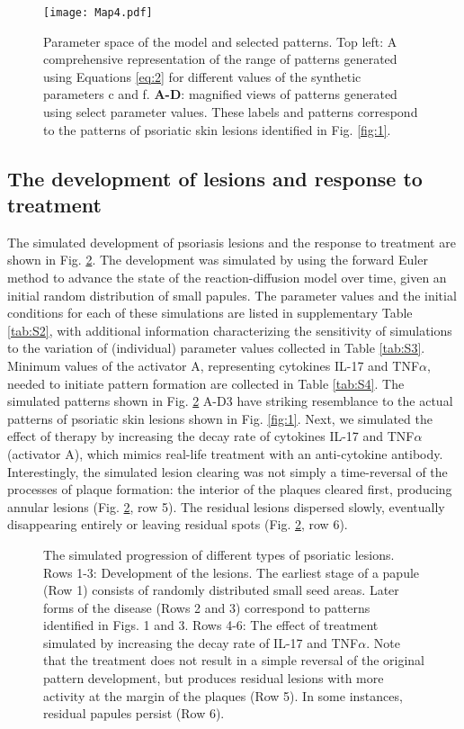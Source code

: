 \begin{figure}[H]
	\centering
	\texttt{[image: Map4.pdf]}
	\caption{Parameter space of the model and selected patterns. Top left: A comprehensive representation of the range of patterns generated using Equations \ref{eq:2} for different values of the synthetic parameters c and f. \textbf{A-D}: magnified views of patterns generated using select parameter values. These labels and patterns correspond to the patterns of psoriatic skin lesions identified in Fig. \ref{fig:1}.}
	\label{fig:3}
\end{figure}

\subsection{The development of lesions and response to treatment}
The simulated development of psoriasis lesions and the response to treatment are shown in Fig. \ref{fig:4}. The development was simulated by using the forward Euler method to advance the state of the reaction-diffusion model over time, given an initial random distribution of small papules. The parameter values and the initial conditions for each of these simulations are listed in supplementary Table \ref{tab:S2}, with additional information characterizing the sensitivity of simulations to the variation of (individual) parameter values collected in Table \ref{tab:S3}. Minimum values of the activator A, representing cytokines IL-17 and TNF$\alpha$, needed to initiate pattern formation are collected in Table \ref{tab:S4}. The simulated patterns shown in Fig. \ref{fig:4} A-D3 have striking resemblance to the actual patterns of psoriatic skin lesions shown in Fig. \ref{fig:1}. Next, we simulated the effect of therapy by increasing the decay rate of cytokines IL-17 and TNF$\alpha$ (activator A), which mimics real-life treatment with an anti-cytokine antibody. Interestingly, the simulated lesion clearing was not simply a time-reversal of the processes of plaque formation: the interior of the plaques cleared first, producing annular lesions (Fig. \ref{fig:4}, row 5). The residual lesions dispersed slowly, eventually disappearing entirely or leaving residual spots (Fig. \ref{fig:4}, row 6). %

\begin{figure}[p]
	\centering
	\caption{The simulated progression of different types of psoriatic lesions. Rows 1-3: Development of the lesions. The earliest stage of a papule (Row 1) consists of randomly distributed small seed areas. Later forms of the disease (Rows 2 and 3) correspond to patterns identified in Figs. 1 and 3. Rows 4-6: The effect of treatment simulated by increasing the decay rate of IL-17 and TNF$\alpha$. Note that the treatment does not result in a simple reversal of the original pattern development, but produces residual lesions with more activity at the margin of the plaques (Row 5). In some instances, residual papules persist (Row 6).}
	\label{fig:4}
\end{figure}

